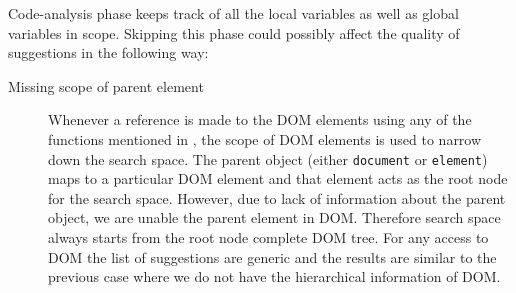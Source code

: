 	 Code-analysis phase keeps track of all the local variables as well as global variables in scope. Skipping this phase could possibly affect the quality of suggestions in the following way:
	
	\begin{description}
		\item[Missing scope of parent element] Whenever a reference is made to the DOM elements using any of the functions mentioned in , the scope of DOM elements is used to narrow down the search space. The parent object (either \texttt{document} or \texttt{element}) maps to a particular DOM element and that element acts as the root node for the search space. However, due to lack of information about the parent object, we are unable the parent element in DOM. Therefore search space always starts from the root node \ie complete DOM tree. For any access to DOM the list of suggestions are generic and the results are similar to the previous case where we do not have the hierarchical information of DOM.
	\end{description}

